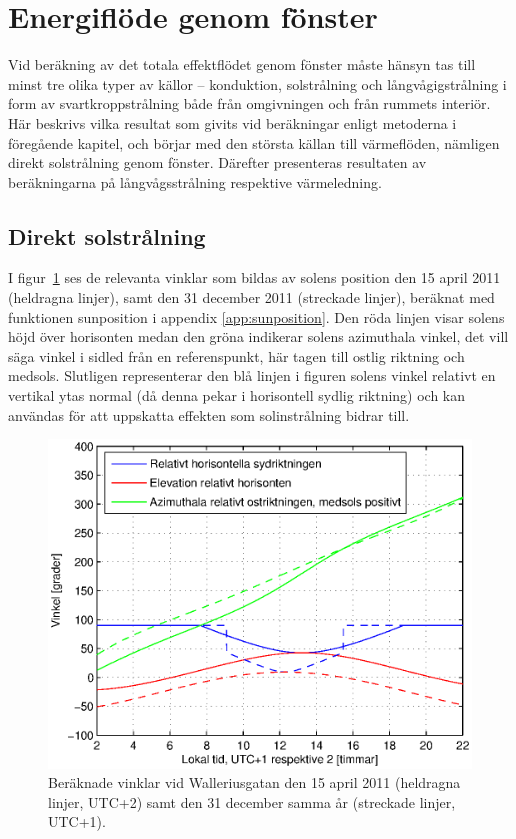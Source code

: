 \section{Energiflöde genom fönster}

Vid beräkning av det totala effektflödet genom fönster måste hänsyn tas till minst tre olika typer av källor – konduktion, solstrålning och långvågigstrålning i form av svartkroppstrålning både från omgivningen och från rummets interiör. Här beskrivs vilka resultat som givits vid beräkningar enligt metoderna i föregående kapitel, och börjar med den största källan till värmeflöden, nämligen direkt solstrålning genom fönster. Därefter presenteras resultaten av beräkningarna på långvågsstrålning respektive värmeledning.

\subsection{Direkt solstrålning}
I figur~\ref{fig:sun0415and1231} ses de relevanta vinklar som bildas av solens position den 15 april 2011 (heldragna linjer), samt den 31 december 2011 (streckade linjer), beräknat med funktionen sunposition i appendix \ref{app:sunposition}. Den röda linjen visar solens höjd över horisonten medan den gröna indikerar solens azimuthala vinkel, det vill säga vinkel i sidled från en referenspunkt, här tagen till ostlig riktning och medsols. Slutligen representerar den blå linjen i figuren solens vinkel relativt en vertikal ytas normal (då denna pekar i horisontell sydlig riktning) och kan användas för att uppskatta effekten som solinstrålning bidrar till.

\begin{figure}[hpbt]
\centering
\includegraphics[scale=0.7]{images/sun0415and1231.eps}
\caption{\label{fig:sun0415and1231} Beräknade vinklar vid Walleriusgatan den 15 april 2011 (heldragna linjer, UTC+2) samt den 31 december samma år (streckade linjer, UTC+1).}
\end{figure}

